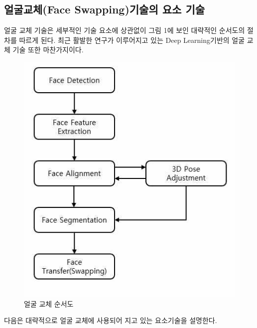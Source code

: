 \documentclass[chapter,oneside]{oblivoir}
\begin{document}
\subsection{ 얼굴교체(Face Swapping)기술의 요소 기술}

얼굴 교체 기술은 세부적인 기술 요소에 상관없이 그림 1에 보인 대략적인 순서도의 절차를 따르게 된다. 최근 활발한 연구가 이루어지고 있는 Deep Learning기반의 얼굴 교체 기술 또한 마찬가지이다. 

\begin{figure}[h!]
  \centering
    \includegraphics{pic/chp1/img371}
  \caption{얼굴 교체 순서도}
\end{figure}

다음은 대략적으로 얼굴 교체에 사용되어 지고 있는 요소기술을 설명한다.
\end{document}
